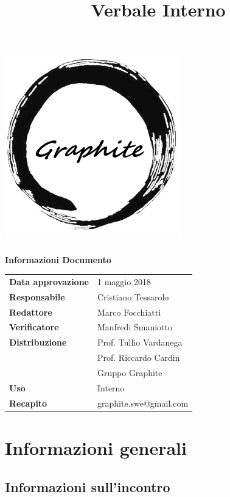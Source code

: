 \documentclass[openany,12pt,a4paper]{article}
\title{Verbale Interno}
\author{}
\begin{document}
	\makeatletter
	\begin{titlepage}
		\setlength{\headsep}{0pt}  
		\begin{center}
			\includegraphics[width=0.5\linewidth]{Logo.png}\\[1em]
			{\huge \bfseries  \@title }\\[10ex]
			\textbf{\Large Informazioni Documento} \\[2em]
			\bgroup
			\def\arraystretch{1.5}
			\begin{tabular}{l|l}
				\textbf{Data approvazione} & 1 maggio 2018 \\
				\textbf{Responsabile} & Cristiano Tessarolo \\
				\textbf{Redattore} & Marco Focchiatti \\
				\textbf{Verificatore} & Manfredi Smaniotto \\
				\textbf{Distribuzione} & Prof. Tullio Vardanega \\
				 & Prof. Riccardo Cardin \\
				 & Gruppo Graphite \\
				\textbf{Uso} & Interno \\
				\textbf{Recapito} & graphite.swe@gmail.com \\
			\end{tabular}
		\egroup
		\end{center}
	\end{titlepage}
	\makeatother

	\thispagestyle{empty}
	\newpage
	
	\tableofcontents
	\newpage
	
	\section{Informazioni generali}
	
	\subsection{Informazioni sull'incontro}
	
\end{document}
